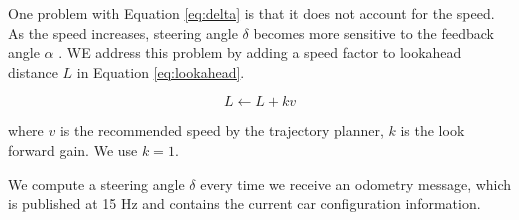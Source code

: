 One problem with Equation \eqref{eq:delta} is that it does not account for the
speed. As the speed increases, steering angle $\delta$ becomes more sensitive
to the feedback angle $\alpha$ \cite{18}. WE address this problem by adding a
speed factor to lookahead distance $L$ in Equation \eqref{eq:lookahead}.

\begin{equation}
    L \leftarrow L + kv
\label{eq:lookahead}
\end{equation}

where $v$ is the recommended speed by the trajectory planner, $k$ is the look
forward gain. We use $k = 1$.

We compute a steering angle $\delta$ every time we receive an odometry message,
which is published at 15 Hz and contains the current car configuration
information.
